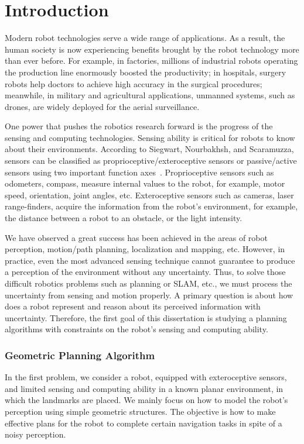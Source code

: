 \chapter{Introduction} 
\label{chp:intro}

Modern robot technologies serve a wide range of applications. 
%
As a result, the human society is now experiencing benefits brought by the robot technology more than ever before.
%
For example, in factories, millions of industrial robots operating the production line enormously boosted the productivity; 
in hospitals, surgery robots help doctors to achieve high accuracy in the surgical procedures; 
meanwhile, in military and agricultural applications, unmanned systems, such as drones, are widely deployed for the aerial surveillance.


%
One power that pushes the robotics research forward is the progress of the sensing and computing technologies. 
%
Sensing ability is critical for robots to know about their environments. 
According to Siegwart, Nourbakhsh, and Scaramuzza, sensors can be classified as proprioceptive/exteroceptive sensors or passive/active sensors using two important function axes~\cite{SieNouSca11}.
%
Proprioceptive sensors such as odometers,
compass, measure internal values to the robot, for example, motor speed, orientation, joint angles, etc.
%
Exteroceptive sensors such as cameras, laser range-finders, acquire the information from the robot's environment, for example, the distance between a robot to an obstacle, or the light intensity. 

%
We have observed a great success has been achieved in the areas of robot perception, motion/path planning, localization and mapping, etc. 
%
However, in practice, even the most advanced sensing technique cannot guarantee to produce a perception of the
environment without any uncertainty.  
%
Thus, to solve those difficult robotics problems such as planning or SLAM, etc., we must process the uncertainty from sensing and motion properly.
%
A primary question is about how does a robot represent and reason about its perceived information with uncertainty.
%
Therefore, the first goal of this dissertation is studying a planning algorithms with constraints on the robot's sensing and computing ability.

\subsection{Geometric Planning Algorithm}
In the first problem, we consider a robot, equipped with exteroceptive sensors,
and limited sensing and computing
ability in a known planar environment, in which the landmarks are
placed. 
We mainly focus on how to model the robot's perception using simple
geometric structures.
The objective is how to make effective plans for the robot to complete certain navigation tasks 
in spite of a noisy perception.

